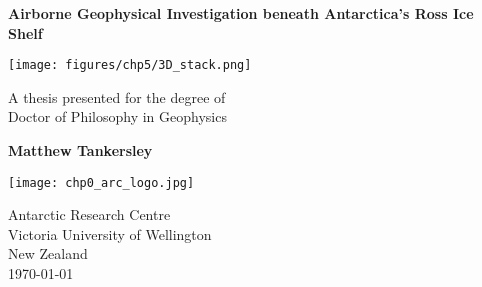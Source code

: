 \begin{titlepage}
  \begin{center}

    \LARGE
    \textbf{
      Airborne Geophysical Investigation beneath Antarctica's Ross Ice Shelf
    }

    \texttt{[image: figures/chp5/3D\_stack.png]}

    \Large
    A thesis presented for the degree of\\
    Doctor of Philosophy in Geophysics

    \vspace{0.8cm}

    \textbf{Matthew Tankersley}

    \texttt{[image: chp0\_arc\_logo.jpg]}

    \Large
    Antarctic Research Centre\\
    Victoria University of Wellington\\
    New Zealand\\
    \today

  \end{center}
\end{titlepage}
